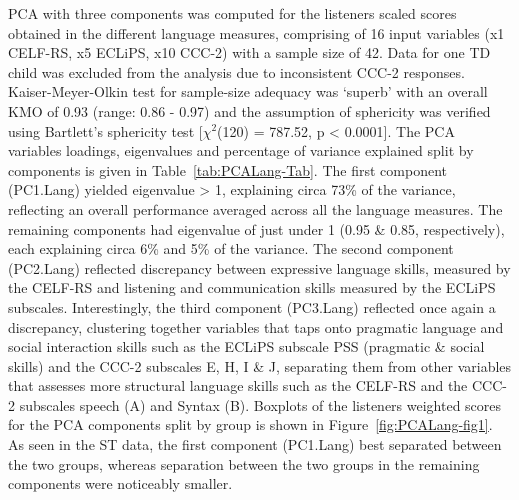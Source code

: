 \documentclass[a4paper, twoside]{templates/ociamthesis}
\begin{document}
PCA with three components was computed for the listeners scaled scores obtained in the different language measures, comprising of 16 input variables (x1 CELF-RS, x5 ECLiPS, x10 CCC-2) with a sample size of 42. Data for one TD child was excluded from the analysis due to inconsistent CCC-2 responses. Kaiser-Meyer-Olkin test for sample-size adequacy was `superb' \autocite{Field2012Chpt17} with an overall KMO of 0.93 (range: 0.86 - 0.97) and the assumption of sphericity was verified using Bartlett's sphericity test {[}\(\chi^2\)(120) = 787.52, p \textless{} 0.0001{]}. The PCA variables loadings, eigenvalues and percentage of variance explained split by components is given in Table~\ref{tab:PCALang-Tab}. The first component (PC1.Lang) yielded eigenvalue \textgreater{} 1, explaining circa 73\% of the variance, reflecting an overall performance averaged across all the language measures. The remaining components had eigenvalue of just under 1 (0.95 \& 0.85, respectively), each explaining circa 6\% and 5\% of the variance. The second component (PC2.Lang) reflected discrepancy between expressive language skills, measured by the CELF-RS and listening and communication skills measured by the ECLiPS subscales. Interestingly, the third component (PC3.Lang) reflected once again a discrepancy, clustering together variables that taps onto pragmatic language and social interaction skills such as the ECLiPS subscale PSS (pragmatic \& social skills) and the CCC-2 subscales E, H, I \& J, separating them from other variables that assesses more structural language skills such as the CELF-RS and the CCC-2 subscales speech (A) and Syntax (B). Boxplots of the listeners weighted scores for the PCA components split by group is shown in Figure~\ref{fig:PCALang-fig1}. As seen in the ST data, the first component (PC1.Lang) best separated between the two groups, whereas separation between the two groups in the remaining components were noticeably smaller.\\
\end{document}
